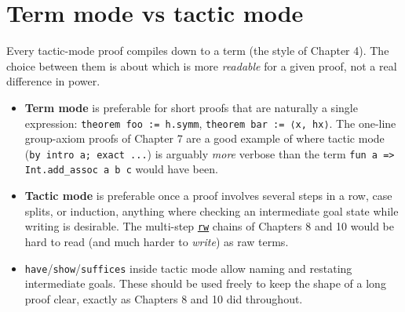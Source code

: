 \section{Term mode vs tactic mode}\label{sec:13-working-efficiently:04-term-vs-tactic-mode:1}

Every tactic-mode proof compiles down to a term (the style of Chapter 4). The choice between them is about which is more \emph{readable} for a given proof, not a real difference in power.

\begin{itemize}
\tightlist
\item
  \textbf{Term mode} is preferable for short proofs that are naturally a single expression: \texttt{theorem foo := h.symm}, \texttt{theorem bar := ⟨x, hx⟩}. The one-line group-axiom proofs of Chapter 7 are a good example of where tactic mode (\texttt{by intro a; exact ...}) is arguably \emph{more} verbose than the term \texttt{fun a => Int.add\_\allowbreak{}assoc a b c} would have been.
\item
  \textbf{Tactic mode} is preferable once a proof involves several steps in a row, case splits, or induction, anything where checking an intermediate goal state while writing is desirable. The multi-step \href{https://lean-lang.org/doc/reference/latest/Tactic-Proofs/Tactic-Reference/}{\texttt{rw}} chains of Chapters 8 and 10 would be hard to read (and much harder to \emph{write}) as raw terms.
\item
  \texttt{have}/\texttt{show}/\texttt{suffices} inside tactic mode allow naming and restating intermediate goals. These should be used freely to keep the shape of a long proof clear, exactly as Chapters 8 and 10 did throughout.
\end{itemize}
